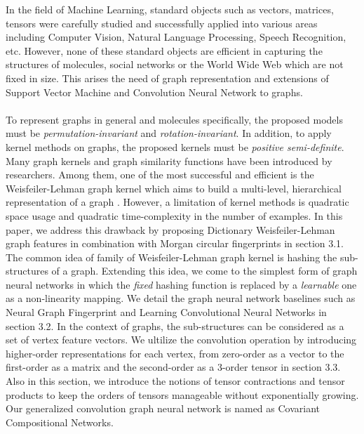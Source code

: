 \documentclass[a4paper]{article}
\begin{document}
In the field of Machine Learning, standard objects such as vectors, matrices, tensors were carefully studied and successfully applied into various areas including Computer Vision, Natural Language Processing, Speech Recognition, etc. However, none of these standard objects are efficient in capturing the structures of molecules, social networks or the World Wide Web which are not fixed in size. This arises the need of graph representation and extensions of Support Vector Machine and Convolution Neural Network to graphs. \\ \\
To represent graphs in general and molecules specifically, the proposed models must be \textit{permutation-invariant} and \textit{rotation-invariant}. In addition, to apply kernel methods on graphs, the proposed kernels must be \textit{positive semi-definite}. Many graph kernels and graph similarity functions have been introduced by researchers. Among them, one of the most successful and efficient is the Weisfeiler-Lehman graph kernel which aims to build a multi-level, hierarchical representation of a graph \cite{Nino}. However, a limitation of kernel methods is quadratic space usage and quadratic time-complexity in the number of examples. In this paper, we address this drawback by proposing Dictionary Weisfeiler-Lehman graph features in combination with Morgan circular fingerprints in section 3.1. The common idea of family of Weisfeiler-Lehman graph kernel is hashing the sub-structures of a graph. Extending this idea, we come to the simplest form of graph neural networks in which the \textit{fixed} hashing function is replaced by a \textit{learnable} one as a non-linearity mapping. We detail the graph neural network baselines such as Neural Graph Fingerprint \cite{Duvenaud} and Learning Convolutional Neural Networks \cite{Niepert} in section 3.2. In the context of graphs, the sub-structures can be considered as a set of vertex feature vectors. We ultilize the convolution operation by introducing higher-order representations for each vertex, from zero-order as a vector to the first-order as a matrix and the second-order as a 3-order tensor in section 3.3. Also in this section, we introduce the notions of tensor contractions and tensor products to keep the orders of tensors manageable without exponentially growing. Our generalized convolution graph neural network is named as Covariant Compositional Networks. \\ \\
\end{document}
